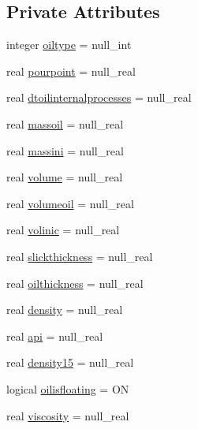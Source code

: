 \subsection*{Private Attributes}
\begin{DoxyCompactItemize}
\item 
integer \mbox{\hyperlink{structmoduleoil__0d_1_1t__var_aac4c543d5bc43cd86c967fc65eba5568}{oiltype}} = null\+\_\+int
\item 
real \mbox{\hyperlink{structmoduleoil__0d_1_1t__var_a243da2d422f6509f8475bb50378ed249}{pourpoint}} = null\+\_\+real
\item 
real \mbox{\hyperlink{structmoduleoil__0d_1_1t__var_a6fd4918119e1a6446e78c9404d9906a9}{dtoilinternalprocesses}} = null\+\_\+real
\item 
real \mbox{\hyperlink{structmoduleoil__0d_1_1t__var_acac9a1d4f87fe0a71a1714e0e4cf7598}{massoil}} = null\+\_\+real
\item 
real \mbox{\hyperlink{structmoduleoil__0d_1_1t__var_a41ff1041283dda5b1ee8d1946ad50af4}{massini}} = null\+\_\+real
\item 
real \mbox{\hyperlink{structmoduleoil__0d_1_1t__var_a8b9e92ef5a409c3d030465ee4501d29a}{volume}} = null\+\_\+real
\item 
real \mbox{\hyperlink{structmoduleoil__0d_1_1t__var_a4e87be1c10d2b1b814008a0c7f4f6b91}{volumeoil}} = null\+\_\+real
\item 
real \mbox{\hyperlink{structmoduleoil__0d_1_1t__var_ae8a65e36229e2a5a6d7cc790acbf823a}{volinic}} = null\+\_\+real
\item 
real \mbox{\hyperlink{structmoduleoil__0d_1_1t__var_aa4520419f51cf86efdb1ff731820251b}{slickthickness}} = null\+\_\+real
\item 
real \mbox{\hyperlink{structmoduleoil__0d_1_1t__var_a740a85712438d8d46042132028ebe85a}{oilthickness}} = null\+\_\+real
\item 
real \mbox{\hyperlink{structmoduleoil__0d_1_1t__var_abfa97a2fe2c1ff26748d91e7d8569ae0}{density}} = null\+\_\+real
\item 
real \mbox{\hyperlink{structmoduleoil__0d_1_1t__var_aaa4292a475a61269f1ed23de25eae99d}{api}} = null\+\_\+real
\item 
real \mbox{\hyperlink{structmoduleoil__0d_1_1t__var_aad7c4fe73824831dc071b0676d3b6286}{density15}} = null\+\_\+real
\item 
logical \mbox{\hyperlink{structmoduleoil__0d_1_1t__var_a02516a5128620421ac165d604f9d9efb}{oilisfloating}} = ON
\item 
real \mbox{\hyperlink{structmoduleoil__0d_1_1t__var_aa168ac80fc485fe24c1342940b80a9c2}{viscosity}} = null\+\_\+real

\end{DoxyCompactItemize}
